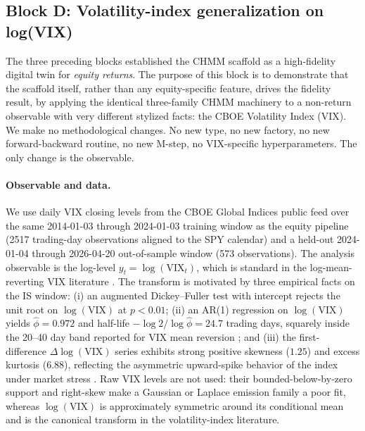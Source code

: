 \subsection{Block D: Volatility-index generalization on log(VIX)}
\label{sec:results_vix}

The three preceding blocks established the CHMM scaffold as a high-fidelity digital twin for \emph{equity returns}.
The purpose of this block is to demonstrate that the scaffold itself, rather than any equity-specific feature, drives the fidelity result, by applying the identical three-family CHMM machinery to a non-return observable with very different stylized facts: the CBOE Volatility Index (VIX).
We make no methodological changes.
No new type, no new factory, no new forward-backward routine, no new M-step, no VIX-specific hyperparameters.
The only change is the observable.

\paragraph{Observable and data.}
We use daily VIX closing levels from the CBOE Global Indices public feed over the same 2014-01-03 through 2024-01-03 training window as the equity pipeline (2517 trading-day observations aligned to the SPY calendar) and a held-out 2024-01-04 through 2026-04-20 out-of-sample window (573 observations).
The analysis observable is the log-level $y_t = \log(\text{VIX}_t)$, which is standard in the log-mean-reverting VIX literature \cite{papanicolaou2014regime, kaeck2013stochastic, dotsis2007empirical, huang2025log}.
The transform is motivated by three empirical facts on the IS window: (i) an augmented Dickey--Fuller test with intercept \cite{mackinnon1996numerical} rejects the unit root on $\log(\text{VIX})$ at $p < 0.01$; (ii) an AR(1) regression on $\log(\text{VIX})$ yields $\hat\phi = 0.972$ and half-life $-\log 2 / \log\hat\phi = 24.7$ trading days, squarely inside the 20--40 day band reported for VIX mean reversion \cite{kaeck2013stochastic}; and (iii) the first-difference $\Delta \log(\text{VIX})$ series exhibits strong positive skewness ($1.25$) and excess kurtosis ($6.88$), reflecting the asymmetric upward-spike behavior of the index under market stress \cite{papanicolaou2014regime}.
Raw VIX levels are not used: their bounded-below-by-zero support and right-skew make a Gaussian or Laplace emission family a poor fit, whereas $\log(\text{VIX})$ is approximately symmetric around its conditional mean and is the canonical transform in the volatility-index literature.

